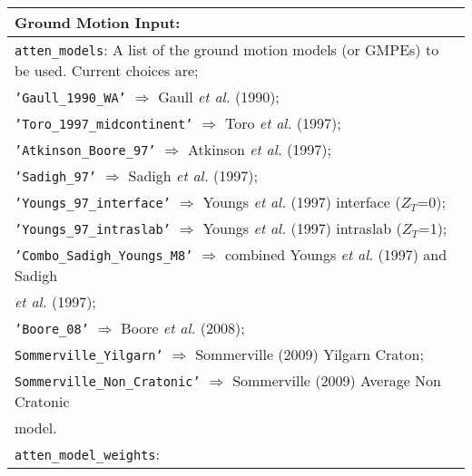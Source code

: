 \documentclass[a4paper, 12pt]{report}
\begin{document}
\vspace{2em}
\begin{tabular}{|p{\textwidth}|}
\hline
\vspace{0.3em} \noindent \Large \textbf{Ground Motion Input:} \normalsize \\
\hline
\vspace{0.1em} \texttt{atten\_models}: 
A list of the ground motion models (or GMPEs) to be used. Current choices are; \\
 \hspace{0.5em} \texttt{'Gaull\_1990\_WA'} $\Rightarrow$ Gaull \textit{et al.} (1990); \\
 \hspace{0.5em}  \texttt{'Toro\_1997\_midcontinent'}  $\Rightarrow$ Toro \textit{et al.} (1997); \\
 \hspace{0.5em}  \texttt{'Atkinson\_Boore\_97'}  $\Rightarrow$ Atkinson \textit{et al.} (1997); \\
 \hspace{0.5em}  \texttt{'Sadigh\_97'}  $\Rightarrow$ Sadigh \textit{et al.} (1997); \\
 \hspace{0.5em}  \texttt{'Youngs\_97\_interface'}  $\Rightarrow$ Youngs \textit{et al.} (1997) interface ($Z_T$=0); \\
 \hspace{0.5em}  \texttt{'Youngs\_97\_intraslab'}  $\Rightarrow$ Youngs \textit{et al.} (1997) intraslab ($Z_T$=1); \\
 \hspace{0.5em}  \texttt{'Combo\_Sadigh\_Youngs\_M8'}  $\Rightarrow$ combined Youngs \textit{et al.} (1997) and Sadigh \\
 \hspace{14.5em} \textit{et al.} (1997); \\
 \hspace{0.5em}  \texttt{'Boore\_08'}  $\Rightarrow$ Boore \textit{et al.} (2008); \\
 \hspace{0.5em} \texttt{Sommerville\_Yilgarn'} $\Rightarrow$ Sommerville (2009) Yilgarn Craton; \\
  \hspace{0.5em} \texttt{Sommerville\_Non\_Cratonic'} $\Rightarrow$ Sommerville (2009) Average Non Cratonic \\
  \hspace{14.5em}  model. \\
\hline
\vspace{0.1em} \texttt{atten\_model\_weights}: 

\end{tabular}
\end{document}
